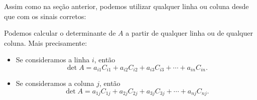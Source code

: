 \documentclass[../livro.tex]{subfiles}  %
\begin{document}
Assim como na seção anterior, podemos utilizar qualquer linha ou coluna desde que com os sinais corretos:


\begin{theorem}
	Podemos calcular o determinante de $A$ a partir de qualquer linha ou de qualquer coluna. Mais precisamente:
	\begin{itemize}
		\item Se consideramos a linha $i$, então
		\begin{equation}
		\det A = a_{i1} C_{i1} + a_{i2} C_{i2} + a_{i3} C_{i3} + \cdots + a_{in} C_{in}.
		\end{equation}
		\item Se consideramos a coluna $j$, então
		\begin{equation}
		\det A = a_{1j} C_{1j} + a_{2j} C_{2j} + a_{3j} C_{3j} + \cdots + a_{nj} C_{nj}.
		\end{equation}
	\end{itemize}
\end{theorem}
\end{document}
